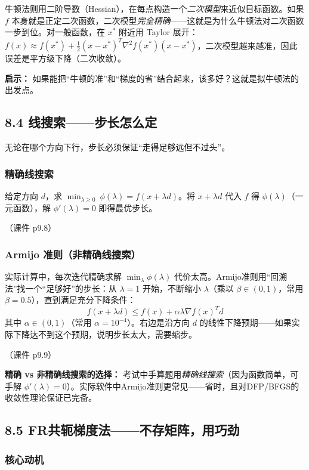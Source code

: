 牛顿法则用二阶导数（Hessian），在每点构造一个\emph{二次模型}来近似目标函数。如果 $f$ 本身就是正定二次函数，二次模型\emph{完全精确}——这就是为什么牛顿法对二次函数一步到位。对一般函数，在 $x^*$ 附近用 Taylor 展开：$f(x) \approx f(x^*) + \frac{1}{2}(x-x^*)^T \nabla^2 f(x^*)(x-x^*)$，二次模型越来越准，因此误差是平方级下降（二次收敛）。

\textbf{启示：} 如果能把“牛顿的准”和“梯度的省”结合起来，该多好？这就是拟牛顿法的出发点。

\subsection{8.4 线搜索——步长怎么定}

无论在哪个方向下行，步长必须保证“走得足够远但不过头”。

\subsubsection{精确线搜索}

给定方向 $d$，求 $\min_{\lambda \ge 0}\ \phi(\lambda) = f(x + \lambda d)$。将 $x+\lambda d$ 代入 $f$ 得 $\phi(\lambda)$（一元函数），解 $\phi'(\lambda) = 0$ 即得最优步长。

（课件 p9.8）

\subsubsection{Armijo 准则（非精确线搜索）}

实际计算中，每次迭代精确求解 $\min_\lambda \phi(\lambda)$ 代价太高。Armijo准则用“回溯法”找一个“足够好”的步长：从 $\lambda = 1$ 开始，不断缩小 $\lambda$（乘以 $\beta \in (0,1)$，常用 $\beta = 0.5$），直到满足充分下降条件：
\[
f(x + \lambda d) \le f(x) + \alpha \lambda \nabla f(x)^T d
\]
其中 $\alpha \in (0,1)$（常用 $\alpha = 10^{-4}$）。右边是沿方向 $d$ 的线性下降预期——如果实际下降达不到这个预期，说明步长太大，需要缩步。

（课件 p9.9）

\textbf{精确 vs 非精确线搜索的选择：} 考试中手算题用\emph{精确线搜索}（因为函数简单，可手解 $\phi'(\lambda)=0$）。实际软件中Armijo准则更常见——省时，且对DFP/BFGS的收敛性理论保证已完备。

\subsection{8.5 FR共轭梯度法——不存矩阵，用巧劲}

\subsubsection{核心动机}

